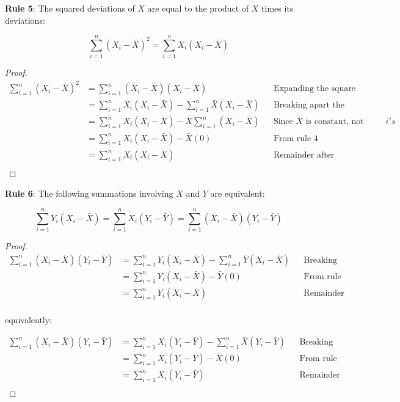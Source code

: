 \documentclass{article}
\begin{document}
\clearpage 

\textbf{Rule 5}: The squared deviations of $X$ are equal to the product of $X$ times its deviations: 

\begin{equation*}
\sum^n_{i=1} (X_i-\bar{X})^2=\sum^n_{i=1} X_i(X_i-\bar{X})	
\end{equation*}

\begin{proof}
	
\begin{align*}
	\sum^n_{i=1} (X_i-\bar{X})^2&=\sum^n_{i=1} (X_i-\bar{X})(X_i-\bar{X})	&& \text{Expanding the square}\\
	&=\sum^n_{i=1} X_i(X_i-\bar{X})-\sum^n_{i=1}\bar{X}(X_i-\bar{X}) && \text{Breaking apart the first term} \\
	&=\sum^n_{i=1} X_i(X_i-\bar{X})-\bar{X}\sum^n_{i=1}(X_i-\bar{X}) && \text{Since }\bar{X} \text{ is constant, not depending on } i's\\
	&=\sum^n_{i=1} X_i(X_i-\bar{X})-\bar{X}(0) && \text{From rule 4} \\
	&=\sum^n_{i=1} X_i(X_i-\bar{X}) && \text{Remainder after multiplying by 0}\\
\end{align*}

\end{proof}

\textbf{Rule 6}: The following summations involving $X$ and $Y$ are equivalent: 

\begin{equation*}
\sum^n_{i=1} Y_i(X_i-\bar{X})=\sum^n_{i=1}X_i(Y_i-\bar{Y})=\sum^n_{i=1} (X_i-\bar{X})(Y_i-\bar{Y})	
\end{equation*}

\begin{proof}

\begin{align*}
	\sum^n_{i=1} (X_i-\bar{X})(Y_i-\bar{Y}) &=\sum^n_{i=1} Y_i(X_i-\bar{X})-\sum^n_{i=1}\bar{Y}(X_i-\bar{X}) && \text{Breaking apart the second term} \\
	&=\sum^n_{i=1} Y_i(X_i-\bar{X})-\bar{Y}(0) && \text{From rule 4}\\
	&=\sum^n_{i=1} Y_i(X_i-\bar{X}) && \text{Remainder after multiplying by 0}\\
\end{align*}

equivalently:

\begin{align*}
	\sum^n_{i=1} (X_i-\bar{X})(Y_i-\bar{Y}) &=\sum^n_{i=1} X_i(Y_i-\bar{Y})-\sum^n_{i=1}\bar{X}(Y_i-\bar{Y}) && \text{Breaking apart the first term} \\
	&=\sum^n_{i=1} X_i(Y_i-\bar{Y})-\bar{X}(0) && \text{From rule 4}\\
	&=\sum^n_{i=1} X_i(Y_i-\bar{Y}) && \text{Remainder after multiplying by 0}\\
\end{align*}

\end{proof}
\end{document}
